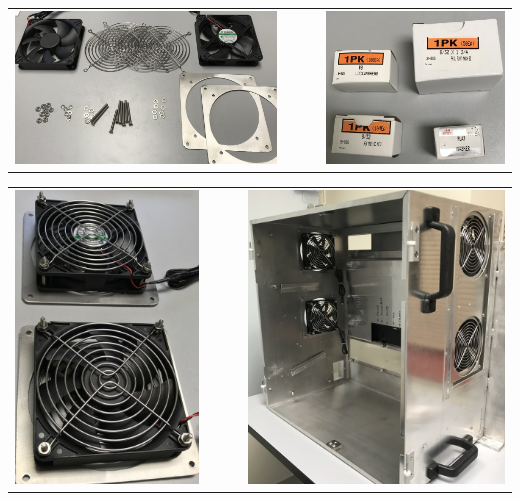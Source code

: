 \begin{center}
\begin{tabular}{ccc}
\includegraphics[height=0.3\columnwidth]
{photos/install-20181106/fan-parts.jpg} &
~~~ &
\includegraphics[height=0.3\columnwidth]
{photos/install-20181106/fan-screws.jpg} \\
\end{tabular}

\begin{tabular}{ccc}
\includegraphics[height=0.6\columnwidth]
{photos/install-20181106/fan-assembled.jpg} &
~~~ &
\includegraphics[height=0.6\columnwidth]
{photos/install-20181106/fan-installed.jpg} \\
\end{tabular}
\end{center}

